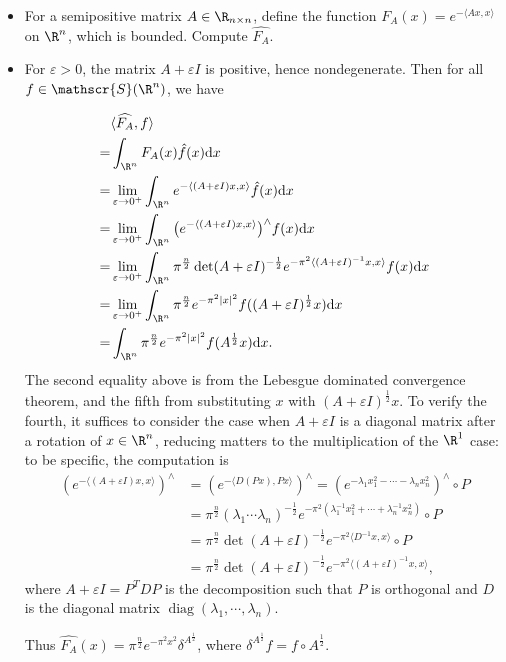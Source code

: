 \begin{itemize}
\item[4.]
For a semipositive matrix $A\in \mathbb{\R}_{n\times n}$, 
define the function $F_A(x)=e^{-\langle Ax,x\rangle}$ on $\R^n$, which is bounded. 
Compute $\widehat{F_A}$.

\item[\textit{Proof:}]
For $\varepsilon>0$, the matrix $A+\varepsilon I$ is positive, hence nondegenerate. 
Then for all $f\in\mathscr{S}(\R^n)$, we have

\begin{align*}
    &\langle\widehat{F_A},f\rangle\\
    =&\int_{\R^n} F_A(x)\hat{f}(x)\mathrm{d}x\\
    =&\lim\limits_{\varepsilon\rightarrow 0^+}\int_{\R^n} e^{-\langle(A+\varepsilon I)x,x\rangle}\hat {f}(x)\mathrm{d}x\\
    =&\lim\limits_{\varepsilon\rightarrow 0^+}\int_{\R^n} \big(e^{-\langle(A+\varepsilon I)x,x\rangle}\big)^\wedge f(x)\mathrm{d}x\\
    =&\lim\limits_{\varepsilon\rightarrow 0^+}\int_{\R^n} \pi^\frac{n}2\det (A+\varepsilon I)^{-\frac12}e^{-\pi^2\langle(A+\varepsilon I)^{-1}x,x\rangle} f(x)\mathrm{d}x\\
    =&\lim\limits_{\varepsilon\rightarrow 0^+}\int_{\R^n} \pi^\frac{n}2e^{-\pi^2|x|^2} f( (A+\varepsilon I)^{\frac12}x)\mathrm{d}x\\
    =&\int_{\R^n} \pi^\frac{n}2e^{-\pi^2|x|^2}f( A^{\frac12}x)\mathrm{d}x.
\end{align*}
The second equality above is from the Lebesgue dominated convergence theorem, and the fifth from substituting $x$ with $(A+\varepsilon I)^{\frac12}x$.
To verify the fourth, it suffices to consider the case when $A+\varepsilon I$ is a diagonal matrix after a rotation of $x\in\R^n$, 
reducing matters to the multiplication of the $\R^1$ case: to be specific, the computation is 
\begin{align*}(e^{-\langle (A+\varepsilon I)x,x\rangle})^\wedge &= (e^{-\langle D(Px),Px\rangle})^\wedge = (e^{- \lambda_{1}x_{1}^{2} - \cdots - \lambda_{n}x_{n}^{2}})^\wedge \circ P\\ 
    &= \pi^{\frac{n}{2}}(\lambda_{1}\cdots\lambda_{n})^{-\frac12}e^{-\pi^2(\lambda_{1}^{-1}x_{1}^{2} + \cdots + \lambda_{n}^{-1}x_{n}^{2})} \circ P \\
    &= \pi^{\frac{n}{2}}\det(A+\varepsilon I)^{-\frac12}e^{-\pi^2 \langle D^{-1}x,x\rangle} \circ P \\
    &= \pi^{\frac{n}{2}}\det(A+\varepsilon I)^{-\frac12}e^{-\pi^2 \langle(A+\varepsilon I)^{-1}x,x\rangle},\end{align*}
where $A+\varepsilon I = P^{T}DP$ is the decomposition such that $P$ is orthogonal 
and $D$ is the diagonal matrix $\operatorname{diag}(\lambda_1,\cdots,\lambda_n)$.

Thus $\widehat {F_A}(x)=\pi^\frac{n}2e^{-\pi^2x^2}\delta^{A^{\frac12}}$, where $\delta^{A^{\frac12}}f=f\circ A^{\frac12}.$
\end{itemize}